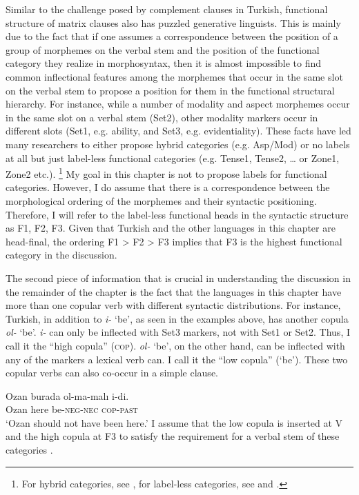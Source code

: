 \documentclass[output=paper]{langsci/langscibook}
\begin{document}
Similar to the challenge posed by complement clauses in Turkish, functional structure of matrix clauses also has puzzled generative linguists. 
This is mainly due to the fact that if one assumes a correspondence between the position of a group of morphemes on the verbal stem 
and the position of the functional category they realize in morphosyntax, then it is almost impossible to find common inflectional features 
among the morphemes that occur in the same slot on the verbal stem to propose a position for them in the functional structural hierarchy. 
For instance, while a number of modality and aspect morphemes occur in the same slot on a verbal stem (Set2), 
other modality markers occur in different slots (Set1, e.g. ability, and Set3, e.g. evidentiality). 
These facts have led many researchers to either propose hybrid categories (e.g. Asp/Mod) or no labels at all 
but just label-less functional categories (e.g. Tense1, Tense2, \ldots{} or Zone1, Zone2 etc.).%
\footnote{%
    For hybrid categories, see \citet{AygenTosun1998}, for label-less categories, see \citet{Sezer2001} and \citet{Enc2004}.
} 
My goal in this chapter is not to propose labels for functional categories. 
However, I do assume that there is a correspondence between the morphological ordering of the morphemes and their syntactic positioning. 
Therefore, I will refer to the label-less functional heads in the syntactic structure as F1, F2, F3. 
Given that Turkish and the other languages in this chapter are head-final, 
the ordering F1 > F2 > F3 implies that F3 is the highest functional category in the discussion. 

The second piece of information that is crucial in understanding the discussion in the remainder of the chapter 
is the fact that the languages in this chapter have more than one copular verb with different syntactic distributions. 
For instance, Turkish, in addition to \textit{i-} `be', as seen in the examples above, has another copula  \textit{ol-} `be'. 
\textit{i-} can only be inflected with Set3 markers, not with Set1 or Set2. 
Thus, I call it the ``high copula'' (\textsc{cop}). \textit{ol-} `be', on the other hand, can be inflected with any of the markers a lexical verb can. 
I call it the ``low copula'' (`be'). These two copular verbs can also co-occur in a simple clause.

\ea%
    \label{kelepirex:key:6}
    \gll Ozan burada ol-ma-malı i-di.\\
    Ozan here be-\textsc{neg}{}-\textsc{nec} \textsc{cop}{}-\textsc{past}\\
    \glt `Ozan should not have been here.'
    \z
I assume that the low copula is inserted at V and the high copula at F3 to satisfy the requirement for a verbal stem of these categories 
\citep{Kelepir2001,Enc2004}.
\end{document}
